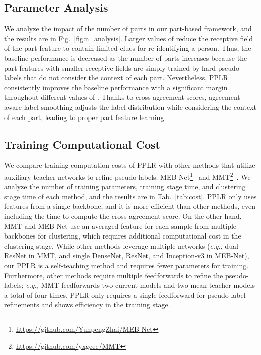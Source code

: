 \documentclass[10pt,twocolumn,letterpaper]{article}
\begin{document}
\subsection{Parameter Analysis}
{
    We analyze the impact of the number of parts  in our part-based framework, and the results are in Fig.~\ref{fig:n_analysis}.
    Larger values of  reduce the receptive field of the part feature to contain limited clues for re-identifying a person.
    Thus, the baseline performance is decreased as the number of parts increases because the part features with smaller receptive fields are simply trained by hard pseudo-labels that do not consider the context of each part.
    Nevertheless, PPLR consistently improves the baseline performance with a significant margin throughout different values of .
    Thanks to cross agreement scores, agreement-aware label smoothing adjusts the label distribution while considering the context of each part, leading to proper part feature learning.
}

\subsection{Training Computational Cost}
{
    We compare training computation costs of PPLR with other methods that utilize auxiliary teacher networks to refine pseudo-labels: MEB-Net\footnote{\url{https://github.com/YunpengZhai/MEB-Net}}~\cite{zhai2020multiple} and MMT\footnote{\url{https://github.com/yxgeee/MMT}}~\cite{ge2020mutual}.
    We analyze the number of training parameters, training stage time, and clustering stage time of each method, and the results are in Tab.~\ref{tab:cost}.
    PPLR only uses features from a single backbone, and it is more efficient than other methods, even including the time to compute the cross agreement score.
    On the other hand, MMT and MEB-Net use an averaged feature for each sample from multiple backbones for clustering, which requires additional computational cost in the clustering stage.
    While other methods leverage multiple networks (\textit{e.g.}, dual ResNet in MMT, and single DenseNet, ResNet, and Inception-v3 in MEB-Net),
    our PPLR is a self-teaching method and requires fewer parameters for training.
    Furthermore, other methods require multiple feedforwards to refine the pseudo-labels; \textit{e.g.,} MMT feedforwards two current models and two mean-teacher models a total of four times. 
    PPLR only requires a single feedforward for pseudo-label refinements and shows efficiency in the training stage.
}
\end{document}
